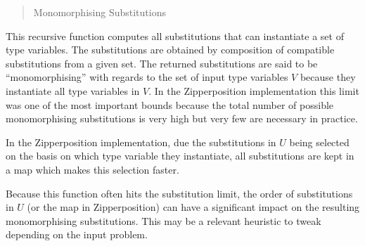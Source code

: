 \documentclass[]{ceurart}
\begin{document}
\begin{quote}
\begin{algorithm}
   \caption{Monomorphising Substitutions}


   \BlankLine



\end{algorithm}
\end{quote}

This recursive function computes all substitutions that can instantiate a set of type variables. The substitutions are obtained by composition of compatible substitutions from a given set. The returned substitutions are said to be ``monomorphising'' with regards to the set of input type variables \(V\) because they instantiate all type variables in \(V\). In the Zipperposition implementation this limit was one of the most important bounds because the total number of possible monomorphising substitutions is very high but very few are necessary in practice.

In the Zipperposition implementation, due the substitutions in \(U\) being selected on the basis on which type variable they instantiate, all substitutions are kept in a map which makes this selection faster.

Because this function often hits the substitution limit, the order of substitutions in \(U\) (or the map in Zipperposition) can have a significant impact on the resulting monomorphising substitutions. This may be a relevant heuristic to tweak depending on the input problem.
\end{document}
